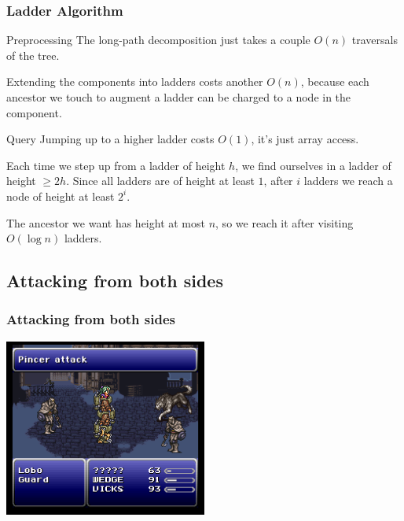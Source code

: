 \documentclass[aspectratio=169]{beamer}
\begin{document}
\begin{frame}
\frametitle{Ladder Algorithm }

\begin{block}{Preprocessing}
  The long-path decomposition just takes a couple $O(n)$ traversals of the
  tree.

  \vspace{1em} Extending the components into ladders costs another $O(n)$,
  because each ancestor we touch to augment a ladder can be charged to a
  node in the component.
\end{block}

\pause

\begin{block}{Query}
  Jumping up to a higher ladder costs $O(1)$, it's just array access.

  \vspace{1em}
  Each time we step up from a ladder of height $h$, we find ourselves in a
  ladder of height $\ge 2h$.  Since all ladders are of height at least
  $1$, after $i$ ladders we reach a node of height at least $2^i$.

  \vspace{1em}
  The ancestor we want has height at most $n$, so we reach it after
  visiting $O(\log n)$ ladders.
\end{block}

\end{frame}

\subsection{Attacking from both sides}

\begin{frame}
\frametitle{Attacking from both sides}

\pause
\centering
\includegraphics[width=0.5\textwidth]{pincer.png}

\end{frame}
\end{document}
